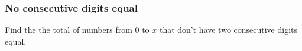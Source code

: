 \subsubsection{No consecutive digits equal}

Find the the total of numbers from $0$ to $x$ that don't have two consecutive digits equal.
